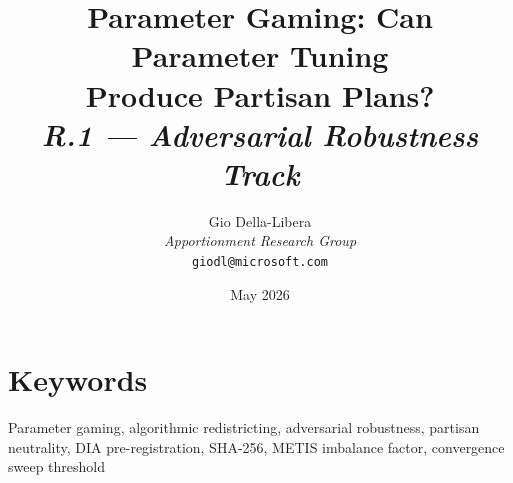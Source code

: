 \documentclass[12pt]{article}
\title{%
  \textbf{Parameter Gaming: Can Parameter Tuning\\
  Produce Partisan Plans?}\\[0.8em]
  \normalsize\textit{R.1 --- Adversarial Robustness Track}%
}
\author{%
  Gio Della-Libera\\
  \textit{Apportionment Research Group}\\
  \small\texttt{giodl@microsoft.com}
}
\date{May 2026}
\begin{document}
\maketitle

\begin{abstract}

\end{abstract}

\section*{Keywords}
Parameter gaming, algorithmic redistricting, adversarial robustness,
partisan neutrality, DIA pre-registration, SHA-256, METIS imbalance factor,
convergence sweep threshold

\tableofcontents
\newpage











\end{document}
